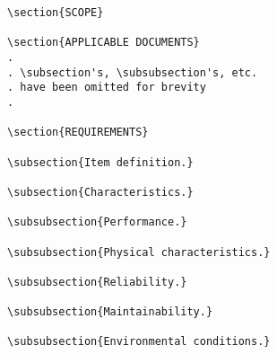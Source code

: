 \begin{itemize}
\begin{small}
\begin{verbatim}
\section{SCOPE}

\section{APPLICABLE DOCUMENTS}
.
. \subsection's, \subsubsection's, etc. 
. have been omitted for brevity
.  

\section{REQUIREMENTS}

\subsection{Item definition.}

\subsection{Characteristics.}

\subsubsection{Performance.}

\subsubsection{Physical characteristics.}

\subsubsection{Reliability.}

\subsubsection{Maintainability.}

\subsubsection{Environmental conditions.}


\end{verbatim}
\end{small}
\end{itemize}
